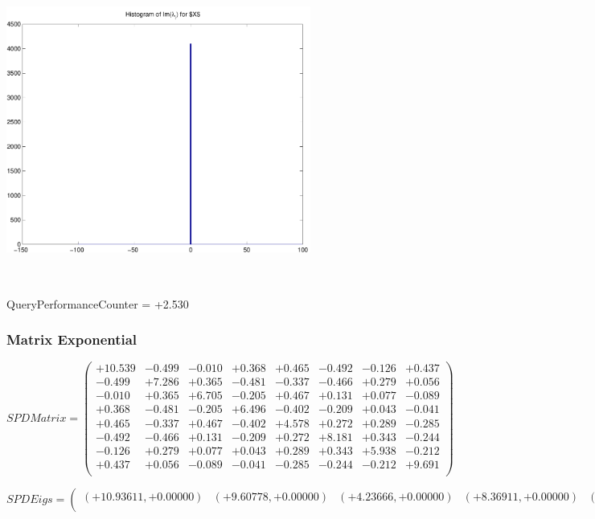 \documentclass[9pt]{article}
\theoremstyle{plain}
\theoremstyle{definition}
\theoremstyle{remark}
\numberwithin{equation}{section}
\begin{document}
\includegraphics[width=10.0cm,height=10.0cm]{Im_lambda_n.pdf}

QueryPerformanceCounter  =  +2.530
\subsubsection{Matrix Exponential }
$SPD Matrix = \left(
\begin{array}{
cccccccc}
+10.539 & -0.499 & -0.010 & +0.368 & +0.465 & -0.492 & -0.126 & +0.437 \\
-0.499 & +7.286 & +0.365 & -0.481 & -0.337 & -0.466 & +0.279 & +0.056 \\
-0.010 & +0.365 & +6.705 & -0.205 & +0.467 & +0.131 & +0.077 & -0.089 \\
+0.368 & -0.481 & -0.205 & +6.496 & -0.402 & -0.209 & +0.043 & -0.041 \\
+0.465 & -0.337 & +0.467 & -0.402 & +4.578 & +0.272 & +0.289 & -0.285 \\
-0.492 & -0.466 & +0.131 & -0.209 & +0.272 & +8.181 & +0.343 & -0.244 \\
-0.126 & +0.279 & +0.077 & +0.043 & +0.289 & +0.343 & +5.938 & -0.212 \\
+0.437 & +0.056 & -0.089 & -0.041 & -0.285 & -0.244 & -0.212 & +9.691 \\
\end{array}
\right)$ \newline 

$SPD Eigs = \left(
\begin{array}{
cccccccc}
(+10.93611,+0.00000) & (+9.60778,+0.00000) & (+4.23666,+0.00000) & (+8.36911,+0.00000) & (+7.56229,+0.00000) & (+5.82791,+0.00000) & (+6.54198,+0.00000) & (+6.33139,+0.00000) \\
\end{array}
\right)$ \newline 
\end{document}
